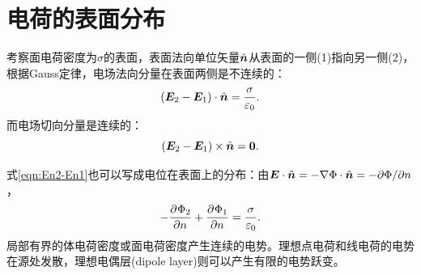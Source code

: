 \section{电荷的表面分布}

考察面电荷密度为$\sigma$的表面，表面法向单位矢量$\mathop{}\!\hat{\bm{n}}$从表面的一侧(1)指向另一侧(2)，根据Gauss定律，电场法向分量在表面两侧是不连续的：
\begin{equation}
    \label{eqn:En2-En1}
    (\bm E_2 - \bm E_1) \cdot \mathop{}\!\hat{\bm{n}} = \frac\sigma{\varepsilon_0}.
\end{equation}
而电场切向分量是连续的：
\begin{equation}
    (\bm E_2 - \bm E_1) \times \mathop{}\!\hat{\bm{n}} = \bm 0.
\end{equation}
\begin{notecaptionblock}
    \label{fig:surface charge}
\end{notecaptionblock}
式\eqref{eqn:En2-En1}也可以写成电位在表面上的分布：由$\bm E \cdot \mathop{}\!\hat{\bm{n}} = -\nabla\Phi \cdot \mathop{}\!\hat{\bm{n}} = -\partial\Phi/\partial n$，
\begin{equation}
    -\frac{\partial^{}\Phi_2}{\partial{n}^{}} + \frac{\partial^{}\Phi_1}{\partial{n}^{}} = \frac\sigma{\varepsilon_0}.
\end{equation}
局部有界的体电荷密度或面电荷密度产生连续的电势。理想点电荷和线电荷的电势在源处发散，理想电偶层(dipole layer)则可以产生有限的电势跃变。

